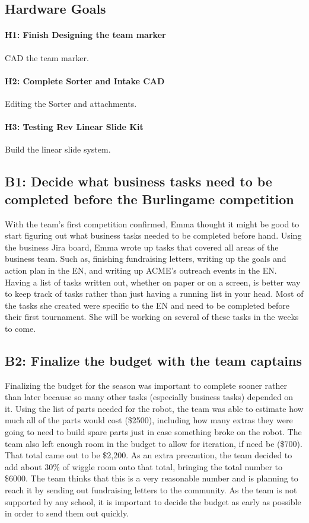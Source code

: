 \documentclass{article}
\begin{document}
\subsection{Hardware Goals}
\paragraph{H1: Finish Designing the team marker}
 CAD the team marker.
\paragraph{H2: Complete Sorter and Intake CAD}
 Editing the Sorter and attachments.
\paragraph{H3: Testing Rev Linear Slide Kit}
 Build the linear slide system. 
\newpage
\subsection{B1: Decide what business tasks need to be completed before the Burlingame competition}

With the team's first competition confirmed, Emma thought it might be good to start figuring out what business tasks needed to be completed before hand. Using the business Jira board, Emma wrote up tasks that covered all areas of the business team. Such as, finishing fundraising letters, writing up the goals and action plan in the EN, and writing up ACME's outreach events in the EN. Having a list of tasks written out, whether on paper or on a screen, is better way to keep track of tasks rather than just having a running list in your head. Most of the tasks she created were specific to the EN and need to be completed before their first tournament. She will be working on several of these tasks in the weeks to come.

\subsection{B2: Finalize the budget with the team captains}

Finalizing the budget for the season was important to complete sooner rather than later because so many other tasks (especially business tasks) depended on it. Using the list of parts needed for the robot, the team was able to estimate how much all of the parts would cost (\$2500), including how many extras they were going to need to build spare parts just in case something broke on the robot. The team also left enough room in the budget to allow for iteration, if need be (\$700). That total came out to be \$2,200. As an extra precaution, the team decided to add about 30\% of wiggle room onto that total, bringing the total number to \$6000. The team thinks that this is a very reasonable number and is planning to reach it by sending out fundraising letters to the community. As the team is not supported by any school, it is important to decide the budget as early as possible in order to send them out quickly.
\end{document}
